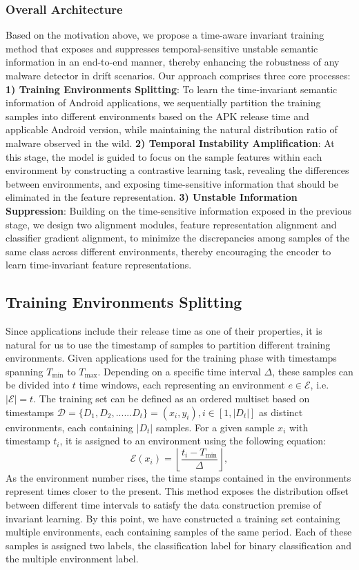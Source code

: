 \subsubsection{Overall Architecture}
Based on the motivation above, we propose a time-aware invariant training method that exposes and suppresses temporal-sensitive unstable semantic information in an end-to-end manner, thereby enhancing the robustness of any malware detector in drift scenarios. Our approach comprises three core processes: \textbf{1) Training Environments Splitting}: To learn the time-invariant semantic information of Android applications, we sequentially partition the training samples into different environments based on the APK release time and applicable Android version, while maintaining the natural distribution ratio of malware observed in the wild. \textbf{2) Temporal Instability Amplification}: At this stage, the model is guided to focus on the sample features within each environment by constructing a contrastive learning task, revealing the differences between environments, and exposing time-sensitive information that should be eliminated in the feature representation. \textbf{3) Unstable Information Suppression}: Building on the time-sensitive information exposed in the previous stage, we design two alignment modules, feature representation alignment and classifier gradient alignment, to minimize the discrepancies among samples of the same class across different environments, thereby encouraging the encoder to learn time-invariant feature representations.

\subsection{Training Environments Splitting}
\label{environment_split}


Since applications include their release time as one of their properties, it is natural for us to use the timestamp of samples to partition different training environments. Given applications used for the training phase with timestamps spanning $T_{\min}$ to $T_{\max}$. Depending on a specific time interval $\Delta$, these samples can be divided into $t$ time windows, each representing an environment $e \in \mathcal{E}$, i.e. $|\mathcal{E}| = t$. The training set can be defined as an ordered multiset based on timestamps $\mathcal{D} = \{D_1,D_2, ...... D_t\} = (x_i, y_i), i \in [1,|D_t|]$ as distinct environments, each containing $|D_t|$ samples. For a given sample $x_i$ with timestamp $t_i$, it is assigned to an environment using the following equation:
\begin{equation}
\mathcal{E}(x_i)=\left\lfloor\frac{t_i-T_{\min }}{\Delta}\right\rfloor,
\end{equation}
As the environment number rises, the time stamps contained in the environments represent times closer to the present. This method exposes the distribution offset between different time intervals to satisfy the data construction premise of invariant learning. By this point, we have constructed a training set containing multiple environments, each containing samples of the same period. Each of these samples is assigned two labels, the classification label for binary classification and the multiple environment label. 


